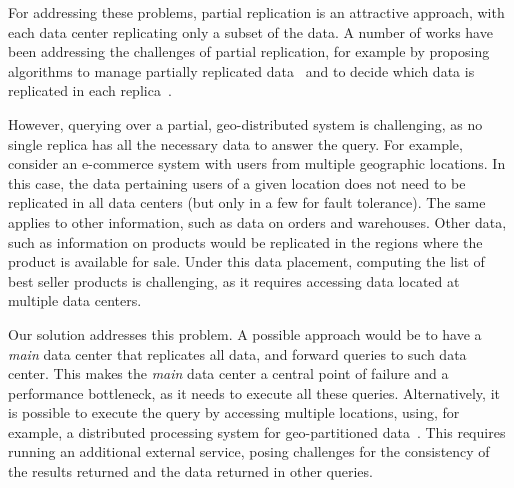 \documentclass[sigplan,twocolumn,review,anonymous]{acmart}
\begin{document}
For addressing these problems, partial replication is an attractive approach, with each data center
replicating only a subset of the data.
A number of works have been addressing the challenges of 
partial replication, for example by proposing algorithms to manage partially 
replicated data~\cite{spanner,sipre, practi, hildred2023caerus} and to decide which data is replicated in each replica~\cite{slog, sipre}.

However, querying over a partial, geo-distributed system is challenging, as no single replica has all the necessary data to answer the query. %
For example, consider an e-commerce system with users from multiple geographic locations.
In this case, the data pertaining users of a given location does not need to be replicated in all data centers
(but only in a few for fault tolerance). The same applies to other information, such as data on orders and 
warehouses.
Other data, such as information on products would be replicated in the regions where the product
is available for sale.  
Under this data placement, computing the list of best seller products is challenging, as it requires
accessing data located at multiple data centers.

Our solution addresses this problem. %
A possible approach would be to
have a \emph{main} data center that replicates all data, and forward queries to such data center.
This makes the \emph{main} data center a central point of failure and a performance bottleneck, as it needs to execute all these queries.
Alternatively, 
it is possible to execute the query by accessing multiple locations,  using, for example, 
a distributed processing system for geo-partitioned data~\cite{kloudas2015pixida,jetstream}.
This requires running an additional external service, posing challenges for the consistency of the results returned and the data returned
in other queries.
\end{document}
